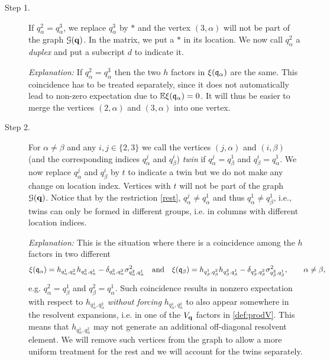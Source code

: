\documentclass[draft]{article}
\newcommand{\bq}{{\bf {q}}}
\newcommand{\fq}{{\frak q}}
\newcommand{\al}{\alpha}
\newcommand{\cG}{{\mathcal G}}
\newcommand{\E}{{\mathbb E }}
\numberwithin{equation}{section}
\numberwithin{theorem}{section}
\numberwithin{definition}{section}
\numberwithin{remark}{section}
\begin{document}
\begin{description}
\item [Step 1.] If $q^2_\al= q^3_\al$, we replace  $q^3_\al$ 
by $\ast$ and the vertex $(3,\al)$ will not be part of the graph $\cG(\bq)$.
In the matrix, we put a $\ast$ in its location.
We now call $q^2_\al$ a {\it duplex} and put a subscript $d$ to indicate it. 



{\it Explanation:}  If $q^2_\al= q^3_\al$ then the
 two $h$ factors in $\xi(\fq_\al)$ are the same. This coincidence has to be treated
separately, since it does not automatically lead
to non-zero expectation due to $\E \xi(\fq_\al)=0$. It will thus
be easier
 to merge the vertices $(2, \alpha)$ and  $(3, \alpha)$
into one vertex.



\item [Step 2.] For $\al\ne \beta$ and any $i, j \in \{ 2, 3\}$
 we call the vertices
 $(j,\al)$ and $(i,\beta)$ (and the corresponding indices 
 $q^j_\al$ and  $q^i_\beta$)  {\it twin}
if  $ q^j_\al  =  q^1_\beta$ and $ q^i_\beta  =  q^1_\al$.
We now replace $q^j_\al $ and $q^i_\beta$ by $t$ to indicate 
 a twin but we do not make any change on  location index.
Vertices with $t$  will  not be part of the graph $\cG(\bq)$.
 Notice that by the restriction \eqref{rest},
 $q^j_\al \not = q^1_\al$ and thus 
$q^1_\al \not = q^1_\beta$, i.e., 
twins can only be formed in different groups, i.e.
in columns with different location indices.



{\it Explanation:} This is the situation where there is
a coincidence among the $h$ factors in two different 
$$
 \xi(\fq_\al) = h_{q^1_\al, q^2_\al}
  h_{q_\alpha^3, q_\alpha^1} -\delta_{q^3_\alpha,  q^2_\alpha}
  \sigma^2_{q^2_\alpha, q^1_\alpha}
\quad \mbox{and} \quad \xi(\fq_\beta) 
= h_{q^1_\beta, q^2_\beta}
  h_{q_\beta^3, q_\beta^1} -\delta_{q^3_\beta,  q^2_\beta}
  \sigma^2_{q^2_\beta, q^1_\beta},\qquad \al\ne \beta,
$$
 e.g. $ q^2_\al  =  q^1_\beta$ and $ q^2_\beta  =  q^1_\al$.
 Such coincidence results in
nonzero expectation with respect to $ h_{q^1_\al, q^2_\al}$
 {\it without forcing}  
 $ h_{q^1_\al, q^2_\al}$ to also appear somewhere in
the resolvent expansions, i.e. in  one of the $V_\bq$ factors
 in \eqref{def:prodV}. This means that $h_{q^1_\al, q^2_\al}$
may not generate an additional off-diagonal resolvent element.
We will remove such vertices from the graph 
to allow a more uniform treatment for the rest and
we will account for the twins  separately.




\end{description}
\end{document}
